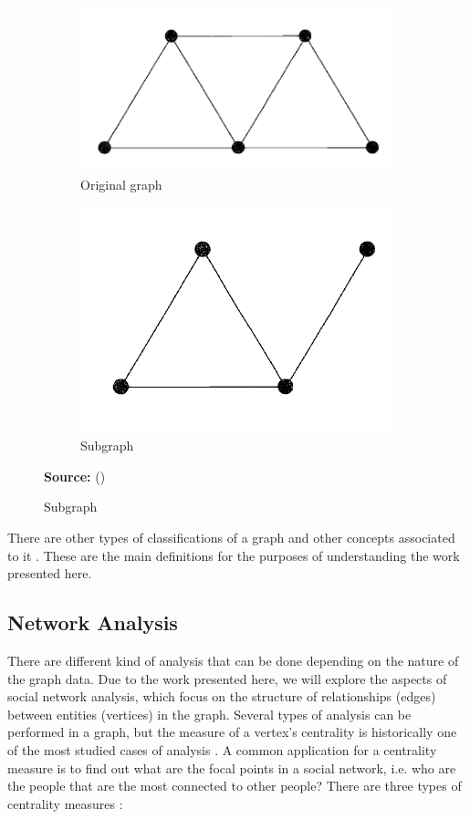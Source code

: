 \begin{description}
\begin{figure}[ht]
\centering
\caption{Example of a subgraph}
\label{fig:figure9}
\begin{subfigure}{.4\textwidth}
	\centering
	\includegraphics[width=.5\textwidth]{images/subgraph_example_1.png}
	\caption{Original graph}
	\label{fig:figure9subfig1}
\end{subfigure} %
\begin{subfigure} {.4\textwidth}
	\centering
	\includegraphics[width=.5\textwidth]{images/subgraph_example_2.png}
	\caption{Subgraph}
	\label{fig:figure9subfig2}
\end{subfigure}
\par\medskip\ABNTEXfontereduzida\selectfont\textbf{Source:} \citeauthor{Tobergte2013} (\citeyear{Tobergte2013}) \par\medskip
\end{figure}
\end{description}
There are other types of classifications of a graph and other concepts associated to it \cite{Tobergte2013}. These are the main definitions for the purposes of understanding the work presented here.

\subsection{Network Analysis}

There are different kind of analysis that can be done depending on the nature of the graph data. Due to the work presented here, we will explore the aspects of social network analysis, which focus on the structure of relationships (edges) between entities (vertices) in the graph. Several types of analysis can be performed in a graph, but the measure of a vertex's centrality is historically one of the most studied cases of analysis \cite{Freeman1978}. A common application for a centrality measure is to find out what are the focal points in a social network, i.e. who are the people that are the most connected to other people? There are three types of centrality measures \cite{Freeman1978}:

